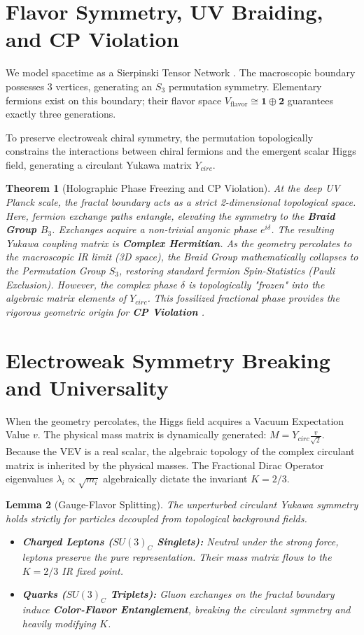\documentclass[11pt,a4paper]{amsart}
\newtheorem{theorem}{Theorem}[section]
\newtheorem{lemma}[theorem]{Lemma}
\theoremstyle{definition}
\begin{document}
\section{Flavor Symmetry, UV Braiding, and CP Violation}
We model spacetime as a Sierpinski Tensor Network \cite{silvafilho2026book}. The macroscopic boundary possesses 3 vertices, generating an $S_3$ permutation symmetry. Elementary fermions exist on this boundary; their flavor space $V_{\text{flavor}} \cong \mathbf{1} \oplus \mathbf{2}$ guarantees exactly three generations.

To preserve electroweak chiral symmetry, the permutation topologically constrains the interactions between chiral fermions and the emergent scalar Higgs field, generating a circulant Yukawa matrix $Y_{circ}$. 

\begin{theorem}[Holographic Phase Freezing and CP Violation]
At the deep UV Planck scale, the fractal boundary acts as a strict 2-dimensional topological space. Here, fermion exchange paths entangle, elevating the symmetry to the \textbf{Braid Group $B_3$}. Exchanges acquire a non-trivial anyonic phase $e^{i\delta}$. The resulting Yukawa coupling matrix is \textbf{Complex Hermitian}. 
As the geometry percolates to the macroscopic IR limit (3D space), the Braid Group mathematically collapses to the Permutation Group $S_3$, restoring standard fermion Spin-Statistics (Pauli Exclusion). However, the complex phase $\delta$ is topologically "frozen" into the algebraic matrix elements of $Y_{circ}$. This fossilized fractional phase provides the rigorous geometric origin for \textbf{CP Violation} \cite{kobayashi1973cp}.
\end{theorem}

\section{Electroweak Symmetry Breaking and Universality}
When the geometry percolates, the Higgs field acquires a Vacuum Expectation Value $v$. The physical mass matrix is dynamically generated: $M = Y_{circ} \frac{v}{\sqrt{2}}$.
Because the VEV is a real scalar, the algebraic topology of the complex circulant matrix is inherited by the physical masses. The Fractional Dirac Operator eigenvalues $\lambda_i \propto \sqrt{m_i}$ algebraically dictate the invariant $K = 2/3$.

\begin{lemma}[Gauge-Flavor Splitting]
The unperturbed circulant Yukawa symmetry holds strictly for particles decoupled from topological background fields.
\begin{itemize}
    \item \textbf{Charged Leptons ($SU(3)_C$ Singlets):} Neutral under the strong force, leptons preserve the pure representation. Their mass matrix flows to the $K=2/3$ IR fixed point.
    \item \textbf{Quarks ($SU(3)_C$ Triplets):} Gluon exchanges on the fractal boundary induce \textbf{Color-Flavor Entanglement}, breaking the circulant symmetry and heavily modifying $K$.
\end{itemize}
\end{lemma}
\end{document}
